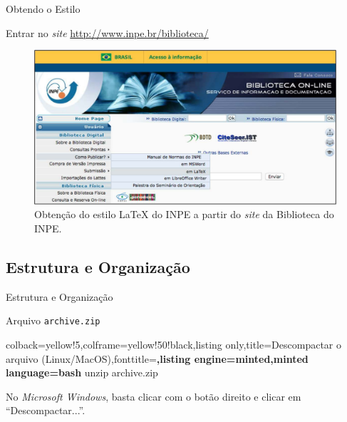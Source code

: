 \documentclass[10pt]{beamer}
\begin{document}
\begin{frame}{Obtendo o Estilo}
\vspace{1em}
\begin{block}{Entrar no \textit{site} \url{http://www.inpe.br/biblioteca/}}
\begin{figure}[H]
    \begin{center}
        \includegraphics[scale=0.25]{./figs/biblio_pub_latex.pdf}
    \end{center}
\caption{Obtenção do estilo \LaTeX{} do INPE a partir do \textit{site} da Biblioteca do INPE.}
\end{figure}
\end{block}
\end{frame}

\subsection{Estrutura e Organização}

\begin{frame}[fragile]{Estrutura e Organização}
    \begin{block}{Arquivo {\tt archive.zip}}
        \vspace{1em}
        \begin{tcblisting}{colback=yellow!5,colframe=yellow!50!black,listing only,title=Descompactar o arquivo (Linux/MacOS),fonttitle=\small\bfseries,listing engine=minted,minted language=bash}
            unzip archive.zip
        \end{tcblisting}
        No \textit{Microsoft Windows}, basta clicar com o botão direito e clicar em ``Descompactar...''.
    \end{block}
\end{frame}
\end{document}

